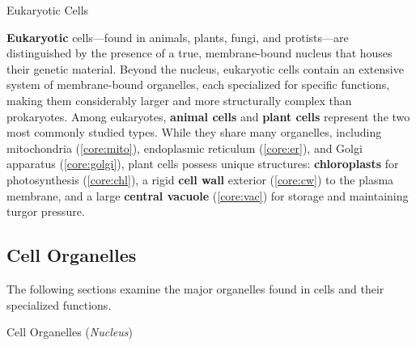 \documentclass[10pt]{article}
\begin{document}
    \begin{core}{Eukaryotic Cells}

      \textbf{Eukaryotic} cells---found in animals, plants, fungi, and protists---are distinguished by the presence of a true, membrane-bound nucleus that houses their genetic material. Beyond the nucleus, eukaryotic cells contain an extensive system of membrane-bound organelles, each specialized for specific functions, making them considerably larger and more structurally complex than prokaryotes. Among eukaryotes, \textbf{animal cells} and \textbf{plant cells} represent the two most commonly studied types. While they share many organelles, including mitochondria (\autoref{core:mito}), endoplasmic reticulum (\autoref{core:er}), and Golgi apparatus (\autoref{core:golgi}), plant cells possess unique structures: \textbf{chloroplasts} for photosynthesis (\autoref{core:chl}), a rigid \textbf{cell wall} exterior (\autoref{core:cw}) to the plasma membrane, and a large \textbf{central vacuole} (\autoref{core:vac}) for storage and maintaining turgor pressure.


    \end{core}

  \subsection{Cell Organelles}

    The following sections examine the major organelles found in cells and their specialized functions.

    \begin{core}[label=core:nuc]{Cell Organelles (\textit{Nucleus})}

  
    \end{core}
\end{document}

